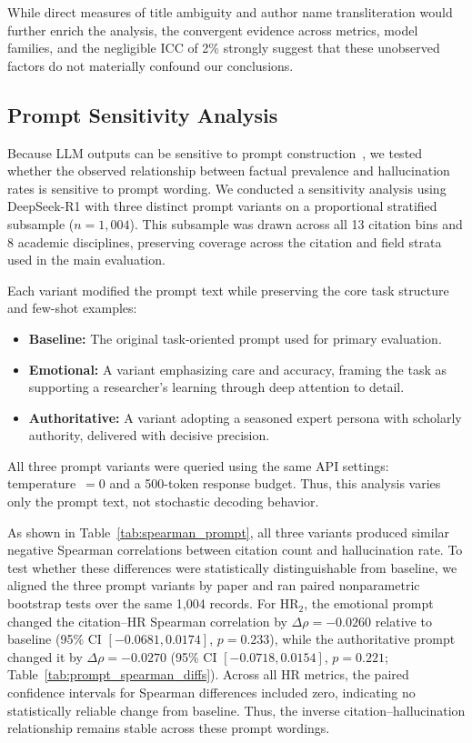 \documentclass[11pt]{article}
\begin{document}
While direct measures of title ambiguity and author name transliteration would further enrich the analysis, the convergent evidence across metrics, model families, and the negligible ICC of 2\% strongly suggest that these unobserved factors do not materially confound our conclusions.

\subsection{Prompt Sensitivity Analysis}
\label{sec:appendix_prompt_sensitivity}

Because LLM outputs can be sensitive to prompt construction~\citep{zhao2021calibrate, lu2022fantastically}, we tested whether the observed relationship between factual prevalence and hallucination rates is sensitive to prompt wording. We conducted a sensitivity analysis using DeepSeek-R1 with three distinct prompt variants on a proportional stratified subsample ($n = 1{,}004$). This subsample was drawn across all 13 citation bins and 8 academic disciplines, preserving coverage across the citation and field strata used in the main evaluation.

Each variant modified the prompt text while preserving the core task structure and few-shot examples:

\begin{itemize}[
    leftmargin=1em,
    itemsep=0.2em,
    topsep=0.2em,
    partopsep=0em,
    parsep=0em
]
    \item \textbf{Baseline:} The original task-oriented prompt used for primary evaluation.
    \item \textbf{Emotional:} A variant emphasizing care and accuracy, framing the task as supporting a researcher's learning through deep attention to detail.
    \item \textbf{Authoritative:} A variant adopting a seasoned expert persona with scholarly authority, delivered with decisive precision.
\end{itemize}

All three prompt variants were queried using the same API settings: temperature~$=0$ and a 500-token response budget. Thus, this analysis varies only the prompt text, not stochastic decoding behavior.

As shown in Table~\ref{tab:spearman_prompt}, all three variants produced similar negative Spearman correlations between citation count and hallucination rate. To test whether these differences were statistically distinguishable from baseline, we aligned the three prompt variants by paper and ran paired nonparametric bootstrap tests over the same 1,004 records. For HR$_2$, the emotional prompt changed the citation--HR Spearman correlation by $\Delta\rho=-0.0260$ relative to baseline (95\% CI $[-0.0681, 0.0174]$, $p=0.233$), while the authoritative prompt changed it by $\Delta\rho=-0.0270$ (95\% CI $[-0.0718, 0.0154]$, $p=0.221$; Table~\ref{tab:prompt_spearman_diffs}). Across all HR metrics, the paired confidence intervals for Spearman differences included zero, indicating no statistically reliable change from baseline. Thus, the inverse citation--hallucination relationship remains stable across these prompt wordings.
\end{document}

